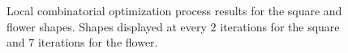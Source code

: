 \documentclass[runningheads]{llncs}
\begin{document}
\begin{figure}[!ht]
{	}%
	\hspace{10pt}
	\hspace{10pt}
		\caption{Local combinatorial optimization process results for the square and flower shapes. Shapes displayed at every $2$ iterations for the square and $7$ iterations for the flower.}	
		\label{fig:local-comb-square-results}
\end{figure}
\end{document}
